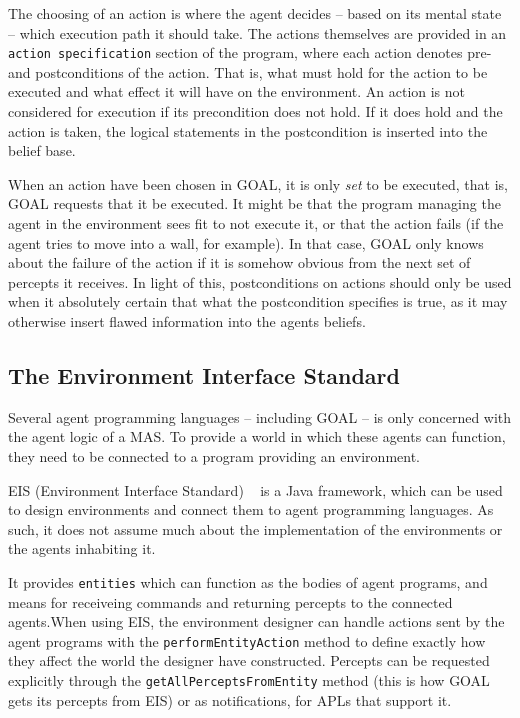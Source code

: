 The choosing of an action is where the agent decides -- based on its
mental state -- which execution path it should take. The actions themselves
are provided in an \texttt{action specification} section of the program,
where each action denotes pre- and postconditions of the action. That
is, what must hold for the action to be executed and what effect it
will have on the environment. An action is not considered for execution
if its precondition does not hold. If it does hold and the action
is taken, the logical statements in the postcondition is inserted
into the belief base. 

When an action have been chosen in GOAL, it is only \emph{set} to
be executed, that is, GOAL requests that it be executed. It might
be that the program managing the agent in the environment sees fit
to not execute it, or that the action fails (if the agent tries to
move into a wall, for example). In that case, GOAL only knows about
the failure of the action if it is somehow obvious from the next set
of percepts it receives. In light of this, postconditions on actions
should only be used when it absolutely certain that what the postcondition
specifies is true, as it may otherwise insert flawed information into
the agents beliefs.


\subsection{The Environment Interface Standard}

Several agent programming languages -- including GOAL -- is only concerned
with the agent logic of a MAS. To provide a world in which these agents
can function, they need to be connected to a program providing an
environment. 

EIS (Environment Interface Standard) ~\cite{EIS09} is a Java framework,
which can be used to design environments and connect them to agent
programming languages. As such, it does not assume much about the
implementation of the environments or the agents inhabiting it. 

It provides \texttt{entities} which can function as the bodies of
agent programs, and means for receiveing commands and returning percepts
to the connected agents.When using EIS, the environment designer can
handle actions sent by the agent programs with the \texttt{performEntityAction}
method to define exactly how they affect the world the designer have
constructed. Percepts can be requested explicitly through the \texttt{getAllPerceptsFromEntity}
method (this is how GOAL gets its percepts from EIS) or as notifications,
for APLs that support it. 

